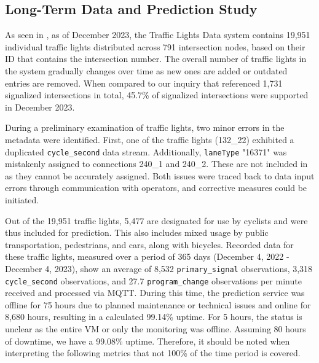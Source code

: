 \subsection{Long-Term Data and Prediction Study}

As seen in , as of December 2023, the Traffic Lights Data system contains 19,951 individual traffic lights distributed across 791 intersection nodes, based on their ID that contains the intersection number. The overall number of traffic lights in the system gradually changes over time as new ones are added or outdated entries are removed. When compared to our inquiry that referenced 1,731 signalized intersections in total, 45.7\% of signalized intersections were supported in December 2023.

During a preliminary examination of traffic lights, two minor errors in the metadata were identified. First, one of the traffic lights (132\_22) exhibited a duplicated \texttt{cycle\_second} data stream. Additionally, \texttt{laneType} "16371" was mistakenly assigned to connections 240\_1 and 240\_2. These are not included in  as they cannot be accurately assigned. Both issues were traced back to data input errors through communication with operators, and corrective measures could be initiated.

Out of the 19,951 traffic lights, 5,477 are designated for use by cyclists and were thus included for prediction. This also includes mixed usage by public transportation, pedestrians, and cars, along with bicycles. Recorded data for these traffic lights, measured over a period of 365 days (December 4, 2022 - December 4, 2023), show an average of 8,532 \texttt{primary\_signal} observations, 3,318 \texttt{cycle\_second} observations, and 27.7 \texttt{program\_change} observations per minute received and processed via MQTT. During this time, the prediction service was offline for 75 hours due to planned maintenance or technical issues and online for 8,680 hours, resulting in a calculated 99.14\% uptime. For 5 hours, the status is unclear as the entire VM or only the monitoring was offline. Assuming 80 hours of downtime, we have a 99.08\% uptime. Therefore, it should be noted when interpreting the following metrics that not 100\% of the time period is covered.

